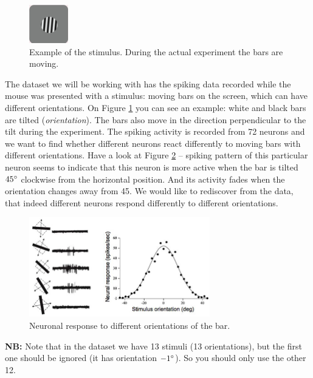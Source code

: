 \documentclass[a4paper,11pt]{article}
\begin{document}
\begin{figure}
	\centering
	\vspace{-12pt}
	\includegraphics[width=0.15\textwidth]{orientationstimulus.jpg}
	\caption{Example of the stimulus. During the actual experiment the bars are moving.}
	\label{fig:stimulusexample}
	\vspace{-5pt}
\end{figure}
The dataset we will be working with has the spiking data recorded while the mouse was presented with a stimulus: moving bars on the screen, which can have different orientations. On Figure \ref{fig:stimulusexample} you can see an example: white and black bars are tilted (\emph{orientation}). The bars also move in the direction perpendicular to the tilt during the experiment. The spiking activity is recorded from 72 neurons and we want to find whether different neurons react differently to moving bars with different orientations. Have a look at Figure \ref{fig:orientationresponse} -- spiking pattern of this particular neuron seems to indicate that this neuron is more active when the bar is tilted $45\degree$ clockwise from the horizontal position. And its activity fades when the orientation changes away from 45. We would like to rediscover from the data, that indeed different neurons respond differently to different orientations.
\begin{figure}[H]
	\centering
	\includegraphics[width=0.7\textwidth]{orientation.jpg} 
	\caption{Neuronal response to different orientations of the bar.}
	\label{fig:orientationresponse}
\end{figure}
\textbf{NB:} Note that in the dataset we have 13 stimuli (13 orientations), but the first one should be ignored (it has orientation $-1\degree$). So you should only use the other 12.
\end{document}
